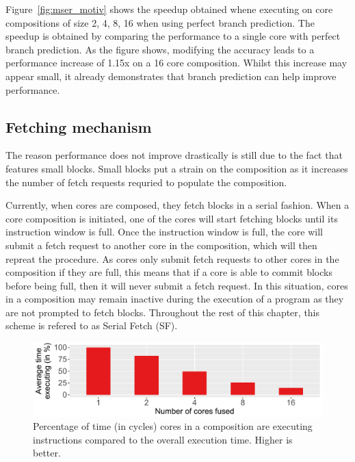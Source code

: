 Figure~\ref{fig:mser_motiv} shows the speedup obtained whene executing  on core compositions of size 2, 4, 8, 16 when using perfect branch prediction.
The speedup is obtained by comparing the performance to a single core with perfect branch prediction.
As the figure shows, modifying the accuracy leads to a performance increase of 1.15x on a 16 core composition.
Whilst this increase may appear small, it already demonstrates that branch prediction can help improve performance.

\subsection{Fetching mechanism}

The reason performance does not improve drastically is still due to the fact that  features small blocks.
Small blocks put a strain on the composition as it increases the number of fetch requests requried to populate the composition.

Currently, when cores are composed, they fetch blocks in a serial fashion.
When a core composition is initiated, one of the cores will start fetching blocks until its instruction window is full.
Once the instruction window is full, the core will submit a fetch request to another core in the composition, which will then repreat the procedure.
As cores only submit fetch requests to other cores in the composition if they are full, this means that if a core is able to commit blocks before being full, then it will never submit a fetch request.
In this situation, cores in a composition may remain inactive during the execution of a program as they are not prompted to fetch blocks.
Throughout the rest of this chapter, this scheme is refered to as Serial Fetch (SF).%

\begin{figure}[t]
    \centering
    \includegraphics[width=1\textwidth]{chapter3/graphics/mser_active_16.pdf}
    \caption{Percentage of time (in cycles) cores in a composition are executing instructions compared to the overall execution time. Higher is better.}
    \label{fig:motivation_perc}
	\vspace{1em}
\end{figure}

